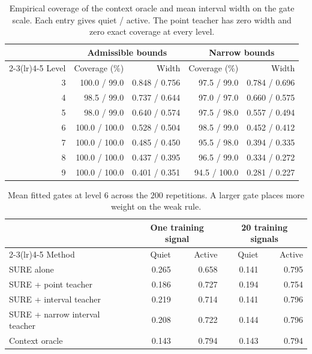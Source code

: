 \documentclass[11pt]{article}
\theoremstyle{plain}
\theoremstyle{definition}
\theoremstyle{remark}
\begin{document}
\begin{table}[!htbp]
\centering
\small
\caption{Empirical coverage of the context oracle and mean interval width on the gate scale. Each entry gives quiet / active. The point teacher has zero width and zero exact coverage at every level.}
\label{tab:bams2-coverage}
\begin{tabular}{rrrrr}
\toprule
& \multicolumn{2}{c}{Admissible bounds} & \multicolumn{2}{c}{Narrow bounds} \\\cmidrule(lr){2-3}\cmidrule(lr){4-5} Level & Coverage (\%) & Width & Coverage (\%) & Width \\
\midrule
3 & 100.0 / 99.0 & 0.848 / 0.756 & 97.5 / 99.0 & 0.784 / 0.696 \\
4 & 98.5 / 99.0 & 0.737 / 0.644 & 97.0 / 97.0 & 0.660 / 0.575 \\
5 & 98.0 / 99.0 & 0.640 / 0.574 & 97.5 / 98.0 & 0.557 / 0.494 \\
6 & 100.0 / 100.0 & 0.528 / 0.504 & 98.5 / 99.0 & 0.452 / 0.412 \\
7 & 100.0 / 100.0 & 0.485 / 0.450 & 95.5 / 98.0 & 0.394 / 0.335 \\
8 & 100.0 / 100.0 & 0.437 / 0.395 & 96.5 / 99.0 & 0.334 / 0.272 \\
9 & 100.0 / 100.0 & 0.401 / 0.351 & 94.5 / 100.0 & 0.281 / 0.227 \\
\bottomrule
\end{tabular}
\end{table}

\begin{table}[!htbp]
\centering
\small
\caption{Mean fitted gates at level $6$ across the $200$ repetitions. A larger gate places more weight on the weak rule.}
\label{tab:bams2-gates}
\begin{tabular}{lrrrr}
\toprule
& \multicolumn{2}{c}{One training signal} & \multicolumn{2}{c}{20 training signals} \\\cmidrule(lr){2-3}\cmidrule(lr){4-5} Method & Quiet & Active & Quiet & Active \\
\midrule
SURE alone & 0.265 & 0.658 & 0.141 & 0.795 \\
SURE + point teacher & 0.186 & 0.727 & 0.194 & 0.754 \\
SURE + interval teacher & 0.219 & 0.714 & 0.141 & 0.796 \\
SURE + narrow interval teacher & 0.208 & 0.722 & 0.144 & 0.796 \\
Context oracle & 0.143 & 0.794 & 0.143 & 0.794 \\
\bottomrule
\end{tabular}
\end{table}
\end{document}
